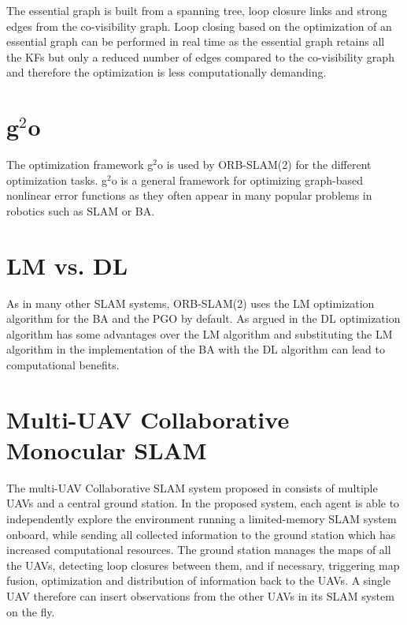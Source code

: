 The essential graph is built from a spanning tree, loop closure links and strong edges from the co-visibility graph. Loop closing based on the optimization of an essential graph can be performed in real time as the essential graph retains all the \acp{KF} but only a reduced number of edges compared to the co-visibility graph and therefore the optimization is less computationally demanding.

\section{g$^2$o}
The optimization framework g$^2$o \cite{Kummerle2011} is used by ORB-SLAM(2) for the different optimization tasks. g$^2$o is a general framework for optimizing graph-based nonlinear error functions as they often appear in many popular problems in robotics such as \ac{SLAM} or \acf{BA}. 

\section{\acl{LM} vs. \acl{DL}}
As in many other \ac{SLAM} systems, ORB-SLAM(2) uses the \acl{LM} optimization algorithm for the \ac{BA} and the \acf{PGO} by default. As argued in \cite{Lourakis2005} the \acf{DL} optimization algorithm has some advantages over the \ac{LM} algorithm and substituting the \ac{LM} algorithm in the implementation of the \ac{BA} with the \ac{DL} algorithm can lead to computational benefits.

\section{Multi-UAV Collaborative Monocular SLAM}
The multi-\ac{UAV} Collaborative \ac{SLAM} system proposed in \cite{Schmuck2017} consists of multiple \acp{UAV} and a central ground station. In the proposed system, each agent is able to independently explore the environment running a limited-memory \ac{SLAM} system onboard, while sending all collected information to the ground station which has increased computational resources. The ground station manages the maps of all the \acp{UAV}, detecting loop closures between them, and if necessary, triggering map fusion, optimization and distribution of information back to the \acp{UAV}. A single \ac{UAV} therefore can insert observations from the other \acp{UAV} in its \ac{SLAM} system on the fly.
